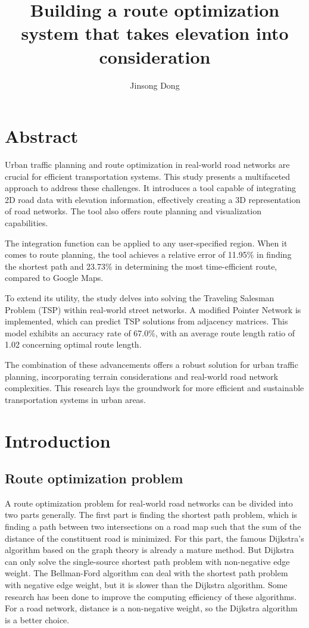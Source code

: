 \documentclass[final-report]{report-template}
\title{Building a route optimization system that takes elevation into consideration}
\author{Jinsong Dong}
\begin{document}
\maketitlepage  %

\section* {Abstract}
Urban traffic planning and route optimization in real-world road networks are crucial for efficient transportation systems. 
This study presents a multifaceted approach to address these challenges. 
It introduces a tool capable of integrating 2D road data with elevation information, 
effectively creating a 3D representation of road networks. 
The tool also offers route planning and visualization capabilities.

The integration function can be applied to any user-specified region. 
When it comes to route planning, 
the tool achieves a relative error of 11.95\% in finding the shortest path and 23.73\% in determining the most time-efficient route, 
compared to Google Maps.

To extend its utility, the study delves into solving the Traveling Salesman Problem (TSP) within real-world street networks. 
A modified Pointer Network is implemented, which can predict TSP solutions from adjacency matrices. 
This model exhibits an accuracy rate of 67.0\%, with an average route length ratio of 1.02 concerning optimal route length.

The combination of these advancements offers a robust solution for urban traffic planning, 
incorporating terrain considerations and real-world road network complexities. 
This research lays the groundwork for more efficient and sustainable transportation systems in urban areas.

\section {Introduction}
\subsection {Route optimization problem}
A route optimization problem for real-world road networks can be divided into two parts generally.
The first part is finding the shortest path problem, 
which is finding a path between two intersections on a road map such that the sum of the distance of the constituent road is minimized.
For this part, the famous Dijkstra's algorithm\cite{Dijkstra:1959aa} based on the graph theory is already a mature method.
But Dijkstra can only solve the single-source shortest path problem with non-negative edge weight.
The Bellman-Ford algorithm\cite{bellman} can deal with the shortest path problem with negative edge weight, 
but it is slower than the Dijkstra algorithm.
Some research has been done to improve the computing efficiency of these algorithms\cite {journals/tpds/BusatoB16}.
For a road network, distance is a non-negative weight, so the Dijkstra algorithm is a better choice.
\end{document}
